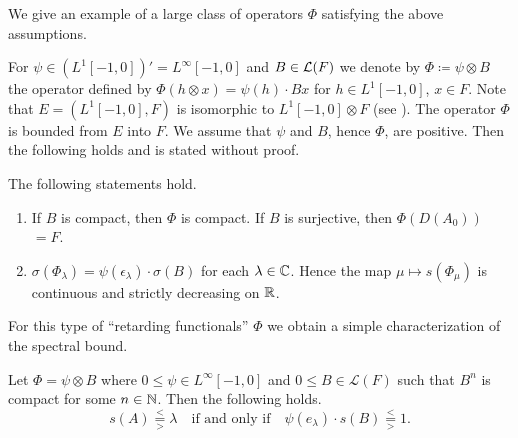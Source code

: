 \begin{example}\label{ex:c4-3.9}
%
We give an example of a large class of operators $\Phi$ satisfying the above assumptions.

For $\psi \in (L^{1}[-1,0])' = L^{\infty}[-1,0]$ and $B \in \mathcal{L}(F)$ we denote by $\Phi \coloneq \psi \otimes B$ the operator defined by $\Phi(h \otimes x) = \psi(h) \cdot Bx$ for $h \in L^{1}[-1,0]$, $x \in F$.
Note that $E = (L^{1}[-1,0],F)$ is isomorphic to $L^{1}[-1,0] \otimes F$ (see \textcite[Chapter III,6.5]{schaefer:1966}).
The operator $\Phi$ is bounded from $E$ into $F$.
We assume that $\psi$ and $B$, hence $\Phi$, are positive.
Then the following holds and is stated without proof.
\begin{lemma*}\label{lem:c4-3.9-kgk}
%
The following statements hold.
\begin{enumerate}[\upshape (i), wide,labelindent=.25em] 
\item \label{lem:c4-3.9-kgk.1}
If\/ $B$ is compact, then $\Phi$ is compact. 
If\/ $B$ is surjective, then $\Phi(D(A_{0}))$ $= F$.

\item \label{lem:c4-3.9-kgk.2}
$\sigma(\Phi_{\lambda}) = \psi(\epsilon_{\lambda}) \cdot \sigma(B)$ for each $\lambda \in \mathbb{C}$. 
Hence the map $\mu \mapsto s(\Phi_{\mu})$ is continuous and strictly decreasing on $\mathbb{R}$.
\end{enumerate}
\end{lemma*}
\end{example}
For this type of \enquote{retarding functionals} $\Phi$ we obtain a simple characterization of the spectral bound.
\begin{corollary*}\label{cor:c4-3.9-kgk}
Let $\Phi = \psi \otimes B$ where $0 \leq \psi \in L^{\infty}[-1,0]$ and $0 \leq B \in \mathcal{L}(F)$ such that $B^{n}$ is compact for some $n \in \mathbb{N}$.
Then the following holds.
\begin{equation}\label{eq:c4-3.10}
s(A) \overset{<}{ \underset{>}{=} } \lambda \quad 
\text{if and only if} 
\quad 
\psi(e_{\lambda}) \cdot s(B) 
\overset{<}{ \underset{>}{=} } 1  .
\end{equation}
\end{corollary*}
